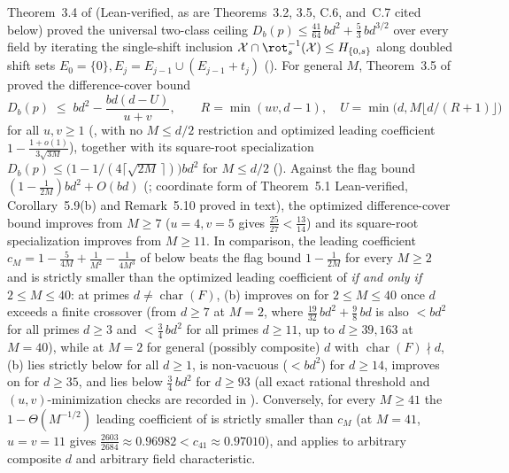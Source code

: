 Theorem~3.4 of \cite{SharedDecoders2026} (Lean-verified, as are Theorems~3.2, 3.5, C.6, and~C.7
cited below) proved the universal two-class ceiling
$D_b(p) \le \frac{41}{64}\,b d^2 + \frac{5}{3}\,b d^{3/2}$ over every field by iterating the
single-shift inclusion $\mathcal{X} \cap \rot_s^{-1}(\mathcal{X}) \le H_{\{0, s\}}$ along doubled
shift sets $E_0 = \{0\}, E_j = E_{j-1} \cup (E_{j-1} + t_j)$ (\cite[Theorem~3.2]{SharedDecoders2026}).
For general $M$, Theorem~3.5 of \cite{SharedDecoders2026} proved the difference-cover bound
\[
  D_b(p) \;\le\; b d^2 - \frac{b d(d - U)}{u + v},
  \qquad
  R = \min(uv, d - 1),\quad U = \min\bigl(d, M\lfloor d/(R + 1)\rfloor\bigr)
\]
for all $u, v \ge 1$ (, with no
$M \le d/2$ restriction and optimized leading coefficient $1 - \frac{1 + o(1)}{3\sqrt{3M}}$), together
with its square-root specialization $D_b(p) \le \bigl(1 - 1/(4\lceil\sqrt{2M}\,\rceil)\bigr) b d^2$
for $M \le d/2$ (). Against the flag bound
$(1 - \frac{1}{2M}) b d^2 + O(bd)$
(\cite[Theorem~5.1, Corollary~5.9(b), Remark~5.10, and Problem~9.1(a)]{SeventeenthPaper2026};
coordinate form of Theorem~5.1 Lean-verified, Corollary~5.9(b) and Remark~5.10 proved in text), the
optimized difference-cover bound improves from $M \ge 7$ ($u = 4, v = 5$ gives
$\frac{25}{27} < \frac{13}{14}$) and its square-root specialization improves from $M \ge 11$.
In comparison, the leading coefficient $c_M = 1 - \frac{5}{4M} + \frac{1}{M^2} - \frac{1}{4M^3}$ of
 below beats the flag bound $1 - \frac{1}{2M}$ for every $M \ge 2$ and is
strictly smaller than the optimized leading coefficient of \cite[Theorem~3.5]{SharedDecoders2026}
\emph{if and only if $2 \le M \le 40$}: at primes $d \ne \operatorname{char}(F)$,
(b) improves on \cite[Theorem~3.5]{SharedDecoders2026} for $2 \le M \le 40$
once $d$ exceeds a finite crossover (from $d \ge 7$ at $M = 2$, where $\frac{19}{32}\,b d^2 +
\frac{9}{8}\,b d$ is also $< b d^2$ for all primes $d \ge 3$ and $< \frac{3}{4}\,b d^2$ for all primes
$d \ge 11$, up to $d \ge 39{,}163$ at $M = 40$), while
at $M = 2$ for general (possibly composite) $d$ with $\operatorname{char}(F) \nmid d$,
(b) lies strictly below \cite[Theorem~3.4]{SharedDecoders2026} for all $d \ge 1$,
is non-vacuous ($< b d^2$) for $d \ge 14$, improves on \cite[Theorem~3.5]{SharedDecoders2026} for
$d \ge 35$, and lies below $\frac{3}{4}\,b d^2$ for $d \ge 93$ (all exact rational threshold and
$(u,v)$-minimization checks are recorded in ).
Conversely, for
every $M \ge 41$ the $1 - \Theta(M^{-1/2})$ leading coefficient of
\cite[Theorem~3.5]{SharedDecoders2026} is strictly smaller than $c_M$ (at $M = 41$, $u = v = 11$ gives
$\frac{2603}{2684} \approx 0.96982 < c_{41} \approx 0.97010$), and \cite[Theorem~3.5]{SharedDecoders2026}
applies to arbitrary composite $d$ and arbitrary field characteristic.

